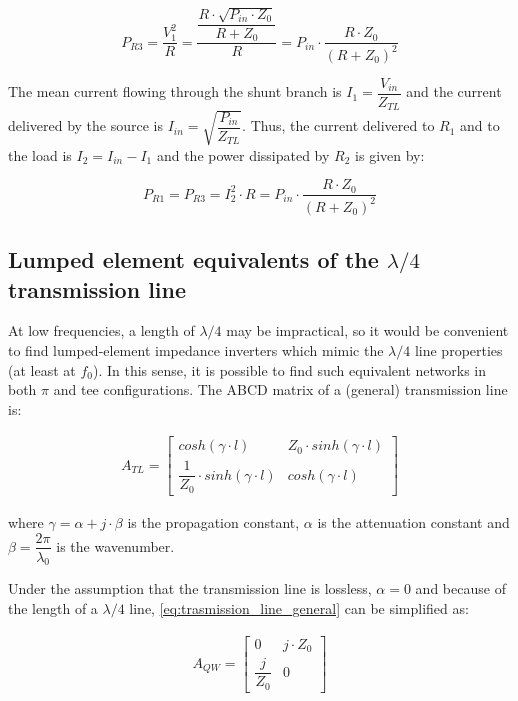 \begin{equation}
P_{R3} = \dfrac{V_1^2}{R} = \dfrac{\dfrac{R \cdot \sqrt{P_{in} \cdot Z_0}}{R + Z_0}}{R} = P_{in} \cdot \dfrac{R \cdot Z_0}{(R + Z_0)^2}
\end{equation}

\noindent The mean current flowing through the shunt branch is $I_{1} = \dfrac{V_{in}}{Z_{TL}}$ and the current delivered by the source is $I_{in} = \sqrt{\dfrac{P_{in}}{Z_{TL}}}$. Thus, the current delivered to $R_1$ and to the load is $I_{2} = I_{in} - I_{1}$ and the power dissipated by $R_2$ is given by:

\begin{equation}
P_{R1} = P_{R3} = I_{2}^2 \cdot R = P_{in} \cdot \dfrac{R \cdot Z_0}{(R + Z_0)^2}
\end{equation}

\clearpage
\subsection{Lumped element equivalents of the $\lambda/4$ transmission line}

\noindent At low frequencies, a length of $\lambda/4$ may be impractical, so it would be convenient to find lumped-element impedance inverters which mimic the $\lambda/4$ line properties (at least at $f_0$). In this sense, it is possible to find such equivalent networks in both $\pi$ and tee configurations. The ABCD matrix of a (general) transmission line is:

\begin{gather}
  A_{TL} = 
 \begin{bmatrix} cosh(\gamma \cdot l) & Z_0 \cdot sinh(\gamma \cdot l) \\ \dfrac{1}{Z_0} \cdot sinh(\gamma \cdot l) & cosh(\gamma \cdot l) \end{bmatrix}
\label{eq:trasmission_line_general}
\end{gather}

\noindent where $\gamma = \alpha + j \cdot \beta$ is the propagation constant, $\alpha$ is the attenuation constant and $\beta = \dfrac{2\pi}{\lambda_0}$ is the wavenumber.
\medskip

\noindent Under the assumption that the transmission line is lossless, $\alpha = 0$ and because of the length of a $\lambda/4$ line, \ref{eq:trasmission_line_general} can be simplified as:

\begin{gather}
  A_{QW} = 
\begin{bmatrix} 0 & j \cdot Z_0 \\ \dfrac{j}{Z_0}  & 0 \end{bmatrix}
 \label{eq:qw-line}
\end{gather}

